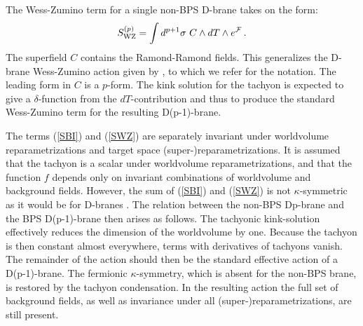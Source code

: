 \documentclass[12pt,a4paper]{article}
\begin{document}
The Wess-Zumino term for a single non-BPS D-brane
 takes on the form:
\begin{equation}
\label{SWZ}
   S^{(p)}_{\rm WZ} = \int d^{p+1}\sigma\,\, C\wedge dT\wedge e^{\cal F}\,.
\end{equation}
The superfield $C$ contains the Ramond-Ramond fields.
 This generalizes the D-brane Wess-Zumino action given by \cite{GHT},
 to which we refer for the notation. The leading form in $C$ is
 a $p$-form. The kink solution for the tachyon is expected to give a
 $\delta$-function from the $dT$-contribution and thus to produce the
 standard Wess-Zumino term for the resulting D(p-1)-brane.

The terms (\ref{SBI})
 and (\ref{SWZ}) are separately invariant
 under worldvolume reparametrizations and target space
 (super-)reparametrizations.
 It is assumed that the tachyon is a scalar under worldvolume
 reparametrizations, and that the function $f$ depends only on
 invariant combinations of worldvolume and background fields.
 However, the sum of (\ref{SBI}) and (\ref{SWZ}) is not $\kappa$-symmetric
 as it would be for D-branes \cite{Aga,Ced,BT}. The relation between
 the non-BPS Dp-brane and the BPS D(p-1)-brane then arises as follows.
 The tachyonic kink-solution effectively reduces the dimension of the
 worldvolume by one. Because the tachyon is then constant almost everywhere,
 terms with derivatives of tachyons vanish. The remainder of the action
 should then be the standard effective action of a D(p-1)-brane.
 The fermionic $\kappa$-symmetry, which is absent for the non-BPS
 brane, is restored by the tachyon condensation.
 In the resulting action the full set of background fields, as well as
 invariance under all (super-)reparametrizations, are still present.
\end{document}
